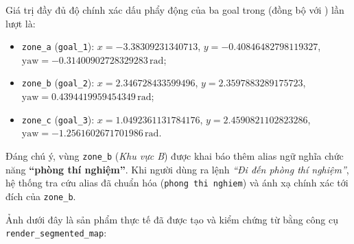 Giá trị đầy đủ độ chính xác dấu phẩy động của ba goal trong  (đồng bộ với ) lần lượt là:
\begin{itemize}[leftmargin=1.2cm]
  \item \texttt{zone\_a} (\texttt{goal\_1}): $x = -3.38309231340713$, $y = -0.40846482798119327$, $\text{yaw} = -0.31400902728329283\,\text{rad}$;
  \item \texttt{zone\_b} (\texttt{goal\_2}): $x = 2.346728433599496$, $y = 2.3597883289175723$, $\text{yaw} = 0.4394419959454349\,\text{rad}$;
  \item \texttt{zone\_c} (\texttt{goal\_3}): $x = 1.0492361131784176$, $y = 2.4590821102823286$, $\text{yaw} = -1.2561602671701986\,\text{rad}$.
\end{itemize}

Đáng chú ý, vùng \texttt{zone\_b} (\textit{Khu vực B}) được khai báo thêm alias ngữ nghĩa chức năng \textbf{``phòng thí nghiệm''}. Khi người dùng ra lệnh \textit{``Đi đến phòng thí nghiệm''}, hệ thống tra cứu alias đã chuẩn hóa (\texttt{phong thi nghiem}) và ánh xạ chính xác tới đích của \texttt{zone\_b}.

Ảnh  dưới đây là sản phẩm thực tế đã được tạo và kiểm chứng từ  bằng công cụ \texttt{render\_segmented\_map}:


